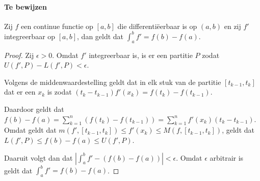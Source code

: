 \label{sec:AH}
\paragraph{Te bewijzen} Zij $f$ een continue functie op $[a,b]$ die differentiëerbaar is op $(a,b)$ en zij $f'$ integreerbaar op $[a,b]$, dan geldt dat $\int_{a}^{b}f'=f(b)-f(a)$.

\begin{proof}
  Zij $\epsilon>0$. Omdat $f'$ integreerbaar is, is er een partitie $P$ zodat $U(f',P)-L(f',P)<\epsilon$. \medskip

  \noindent Volgens de middenwaardestelling geldt dat in elk stuk van de partitie $[t_{k-1},t_{k}]$ dat er een $x_{k}$ is zodat $(t_{k}-t_{k-1})f'(x_{k})=f(t_{k})-f(t_{k-1})$. \medskip

  \noindent Daardoor geldt dat $f(b)-f(a)=\sum\limits_{k=1}^{n}(f(t_{k})-f(t_{k-1}))=\sum\limits_{k=1}^{n}f'(x_{k})(t_{k}-t_{k-1})$. Omdat geldt dat $m(f',[t_{k-1},t_{k}])\leq f'(x_{k})\leq M(f,[t_{k-1},t_{k}])$, geldt dat $L(f',P)\leq f(b)-f(a)\leq U(f',P)$. \medskip

  \noindent Daaruit volgt dan dat $|\int_{a}^{b}f'-(f(b)-f(a))|<\epsilon$. Omdat $\epsilon$ arbitrair is geldt dat $\int_{a}^{b}f'=f(b)-f(a)$.
\end{proof}
